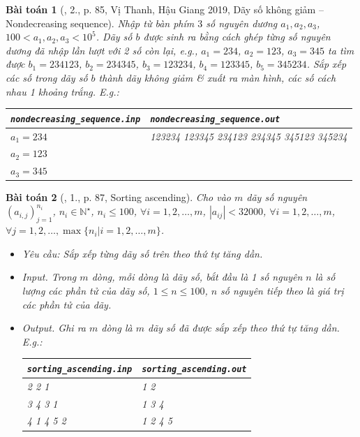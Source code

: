 \documentclass{article}
\newtheorem{baitoan}{Bài toán}
\begin{document}
\begin{baitoan}[\cite{VietSTEM2021}, 2., p. 85, Vị Thanh, Hậu Giang 2019, Dãy số không giảm -- Nondecreasing sequence]
	Nhập từ bàn phím $3$ số nguyên dương $a_1,a_2,a_3$, $100 < a_1,a_2,a_3 < 10^5$. Dãy số $b$ được sinh ra bằng cách ghép từng số nguyên dương đã nhập lần lượt với 2 số còn lại, e.g., $a_1 = 234$, $a_2 = 123$, $a_3 = 345$ ta tìm được $b_1 = 234123$, $b_2 = 234345$, $b_3 = 123234$, $b_4 = 123345$, $b_5 = 345234$. Sắp xếp các số trong dãy số $b$ thành dãy không giảm \& xuất ra màn hình, các số cách nhau 1 khoảng trắng. E.g.:
	\begin{table}[H]
		\centering
		\begin{tabular}{|l|l|}
			\hline
			\verb|nondecreasing_sequence.inp| & \verb|nondecreasing_sequence.out| \\
			\hline
			$a_1 = 234$  & 123234 123345 234123 234345 345123 345234 \\
			$a_2 = 123$ & \\
			$a_3 = 345$ & \\
			\hline
		\end{tabular}
	\end{table}
\end{baitoan}

\begin{baitoan}[\cite{VietSTEM2021}, 1., p. 87, Sorting ascending]
	Cho vào $m$ dãy số nguyên $(a_{i,j})_{j=1}^{n_i}$, $n_i\in\mathbb{N}^\star$, $n_i\le100$, $\forall i = 1,2,\ldots,m$, $|a_{ij}| < 32000$, $\forall i = 1,2,\ldots,m$, $\forall j = 1,2,\ldots,\max\{n_i|i = 1,2,\ldots,m\}$.
	\begin{itemize}
		\item {\sf Yêu cầu:} Sắp xếp từng dãy số trên theo thứ tự tăng dần.
		\item {\sf Input.} Trong $m$ dòng, mỗi dòng là dãy số, bắt đầu là 1 số nguyên $n$ là số lượng các phần tử của dãy số, $1\le n\le100$, $n$ số nguyên tiếp theo là giá trị các phần tử của dãy.
		\item {\sf Output.} Ghi ra $m$ dòng là $m$ dãy số đã được sắp xếp theo thứ tự tăng dần. E.g.:
		\begin{table}[H]
			\centering
			\begin{tabular}{|l|l|}
				\hline
				\verb|sorting_ascending.inp| & \verb|sorting_ascending.out| \\
				\hline
				2 2 1  & 1 2 \\
				3 4 3 1 & 1 3 4 \\
				4 1 4 5 2 & 1 2 4 5 \\
				\hline
			\end{tabular}
		\end{table}
	\end{itemize}
\end{baitoan}
\end{document}
